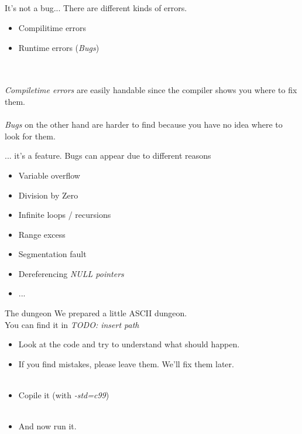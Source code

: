 \subsection{}
\begin{frame}{It's not a bug...}
	There are different kinds of errors.
	\begin{itemize}
		\item Compilitime errors
		\item Runtime errors (\textit{Bugs})
	\end{itemize}\ \\\ \\
	\textit{Compiletime errors} are easily handable since the compiler shows you where to fix them.\\\ \\
	\textit{Bugs} on the other hand are harder to find because you have no idea where to look for them.
\end{frame}
\begin{frame}{... it's a feature.}
	Bugs can appear due to different reasons
	\begin{itemize}
		\item Variable overflow
		\item Division by Zero
		\item Infinite loops / recursions
		\item Range excess
		\item Segmentation fault
		\item Dereferencing \textit{NULL pointers}
		\item ...
	\end{itemize}
\end{frame}
\begin{frame}{The dungeon}
	We prepared a little ASCII dungeon.\\
	You can find it in \textit{TODO: insert path}\\
	\begin{itemize}
		\item Look at the code and try to understand what should happen.
		\item If you find mistakes, please leave them. We'll fix them later.
		\\\ 
		\item Copile it (with \textit{-std=c99})
		\\\ 
		\item And now run it.
	\end{itemize}
	
\end{frame}
